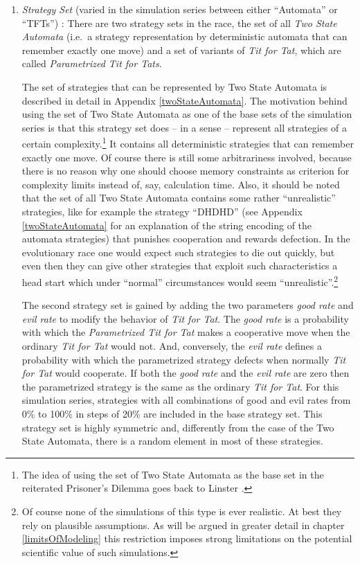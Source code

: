 \begin{enumerate}
\label{seriesParameters}

\item {\em Strategy Set} (varied in the simulation series between either
  ``Automata'' or ``TFTs'') : There are two strategy sets in the race, the set
  of all {\em Two State Automata} (i.e.\ a strategy representation by
  deterministic automata that can remember exactly one move) and a set of
  variants of {\em Tit for Tat}, which are called {\em Parametrized Tit for
    Tats}.

  The set of strategies that can be represented by Two State Automata is
  described in detail in Appendix \ref{twoStateAutomata}. The motivation
  behind using the set of Two State Automata as one of the base sets of the
  simulation series is that this strategy set does -- in a sense -- represent
  all strategies of a certain complexity.\footnote{The idea of using the set
    of Two State Automata as the base set in the reiterated Prisoner's Dilemma
    goes back to Linster \cite[p.\ 315]{binmore:1998}.} It contains all
  deterministic strategies that can remember exactly one move. Of course there
  is still some arbitrariness involved, because there is no reason why one
  should choose memory constraints as criterion for complexity limits
  instead of, say, calculation time.  Also, it should be noted that the set of
  all Two State Automata contains some rather ``unrealistic'' strategies, like
  for example the strategy ``DHDHD'' (see Appendix \ref{twoStateAutomata} for
  an explanation of the string encoding of the automata strategies) that
  punishes cooperation and rewards defection. In the evolutionary race one
  would expect such strategies to die out quickly, but even then they can give
  other strategies that exploit such characteristics a head start which under
  ``normal'' circumstances would seem ``unrealistic''.\footnote{Of course none
    of the simulations of this type is ever realistic. At best they rely on
    plausible assumptions. As will be argued in greater detail in chapter
    \ref{limitsOfModeling} this restriction imposes strong limitations on the
    potential scientific value of such simulations.}

  The second strategy set is gained by adding the two parameters {\em good
    rate} and {\em evil rate} to modify the behavior of {\em Tit for Tat}.
  The {\em good rate} is a probability with which the {\em Parametrized Tit
    for Tat} makes a cooperative move when the ordinary {\em Tit for Tat}
  would not. And, conversely, the {\em evil rate} defines a probability with
  which the parametrized strategy defects when normally {\em Tit for Tat}
  would cooperate. If both the {\em good rate} and the {\em evil rate} are
  zero then the parametrized strategy is the same as the ordinary {\em Tit
    for Tat}. For this simulation series, strategies with all combinations of
  good and evil rates from 0\% to 100\% in steps of 20\% are included in the
  base strategy set. This strategy set is highly symmetric and, differently from
  the case of the Two State Automata, there is a random element in most
  of these strategies.


\end{enumerate}
